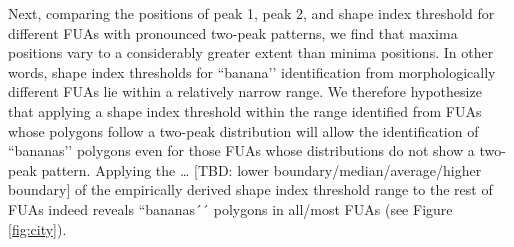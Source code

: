 Next, comparing the positions of peak 1, peak 2, and shape index threshold for different FUAs with pronounced two-peak patterns, we find that maxima positions vary to a considerably greater extent than minima positions. In other words, shape index thresholds for ``banana’’ identification from morphologically different FUAs lie within a relatively narrow range. We therefore hypothesize that applying a shape index threshold within the range identified from FUAs whose polygons follow a two-peak distribution will allow the identification of ``bananas’’ polygons even for those FUAs whose distributions do not show a two-peak pattern. Applying the … [TBD: lower boundary/median/average/higher boundary] of the empirically derived shape index threshold range to the rest of FUAs indeed reveals ``bananas´´ polygons in all/most FUAs (see Figure \ref{fig:city}).